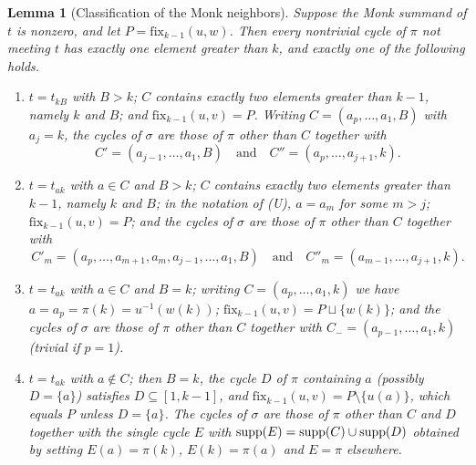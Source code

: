 \documentclass{amsart}
\newtheorem{lemma}{Lemma}[section]
\theoremstyle{definition}
\theoremstyle{remark}
\numberwithin{equation}{section}
\newcommand{\fx}{\mathrm{fix}}
\begin{document}
\begin{lemma}[Classification of the Monk neighbors] \label{lemma:neighbors}
Suppose the Monk summand of $t$ is nonzero, and let $P=\fx_{k-1}(u,w)$. Then every nontrivial cycle of $\pi$ not meeting $t$ has exactly one element greater than $k$, and exactly one of the following holds.
\begin{enumerate}
\item[(U)] $t=t_{kB}$ with $B>k$; $C$ contains exactly two elements greater than $k-1$, namely $k$ and $B$; and $\fx_{k-1}(u,v)=P$. Writing $C=(a_p,\ldots,a_1,B)$ with $a_j=k$, the cycles of $\sigma$ are those of $\pi$ other than $C$ together with
$$C'=(a_{j-1},\ldots,a_1,B)\quad\text{and}\quad C''=(a_p,\ldots,a_{j+1},k).$$
\item[(S)] $t=t_{ak}$ with $a\in C$ and $B>k$; $C$ contains exactly two elements greater than $k-1$, namely $k$ and $B$; in the notation of (U), $a=a_m$ for some $m>j$; $\fx_{k-1}(u,v)=P$; and the cycles of $\sigma$ are those of $\pi$ other than $C$ together with
$$C'_m=(a_p,\ldots,a_{m+1},a_m,a_{j-1},\ldots,a_1,B)\quad\text{and}\quad C''_m=(a_{m-1},\ldots,a_{j+1},k).$$
\item[(P)] $t=t_{ak}$ with $a\in C$ and $B=k$; writing $C=(a_p,\ldots,a_1,k)$ we have $a=a_p=\pi(k)=u^{-1}(w(k))$; $\fx_{k-1}(u,v)=P\sqcup\{w(k)\}$; and the cycles of $\sigma$ are those of $\pi$ other than $C$ together with $C_-=(a_{p-1},\ldots,a_1,k)$ (trivial if $p=1$).
\item[(M)] $t=t_{ak}$ with $a\notin C$; then $B=k$, the cycle $D$ of $\pi$ containing $a$ (possibly $D=\{a\}$) satisfies $D\subseteq[1,k-1]$, and $\fx_{k-1}(u,v)=P\setminus\{u(a)\}$, which equals $P$ unless $D=\{a\}$. The cycles of $\sigma$ are those of $\pi$ other than $C$ and $D$ together with the single cycle $E$ with $\mathrm{supp}(E)=\mathrm{supp}(C)\cup\mathrm{supp}(D)$ obtained by setting $E(a)=\pi(k)$, $E(k)=\pi(a)$ and $E=\pi$ elsewhere.
\end{enumerate}
\end{lemma}
\end{document}
